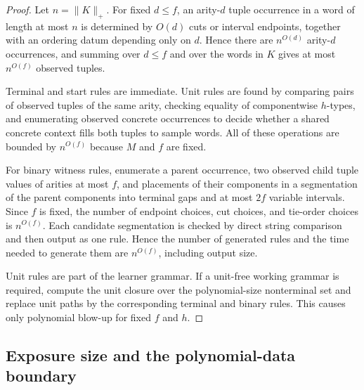 \documentclass[11pt,a4paper]{article}
\theoremstyle{remark}
\begin{document}
\begin{proof}
Let \(n=\|K\|_+\).  For fixed \(d\le f\), an arity-\(d\) tuple occurrence in a
word of length at most \(n\) is determined by \(O(d)\) cuts or interval endpoints,
together with an ordering datum depending only on \(d\).  Hence there are
\(n^{O(d)}\) arity-\(d\) occurrences, and summing over \(d\le f\) and over the
words in \(K\) gives at most \(n^{O(f)}\) observed tuples.

Terminal and start rules are immediate.  Unit rules are found by comparing
pairs of observed tuples of the same arity, checking equality of componentwise
\(h\)-types, and enumerating observed concrete occurrences to decide whether a
shared concrete context fills both tuples to sample words.  All of these
operations are bounded by \(n^{O(f)}\) because \(M\) and \(f\) are fixed.

For binary witness rules, enumerate a parent occurrence, two observed child
tuple values of arities at most \(f\), and placements of their components in a
segmentation of the parent components into terminal gaps and at most \(2f\)
variable intervals.  Since \(f\) is fixed, the
number of endpoint choices, cut choices, and tie-order choices is
\(n^{O(f)}\).  Each candidate segmentation is checked by direct string
comparison and then output as one rule.  Hence the number of generated rules
and the time needed to generate them are \(n^{O(f)}\), including output size.

Unit rules are part of the learner grammar.  If a unit-free working grammar is
required, compute the unit closure over the polynomial-size nonterminal set and
replace unit paths by the corresponding terminal and binary rules.  This causes
only polynomial blow-up for fixed \(f\) and \(h\).
\end{proof}

\subsection{Exposure size and the polynomial-data boundary}
\label{subsec:exposure-boundary}
\end{document}
